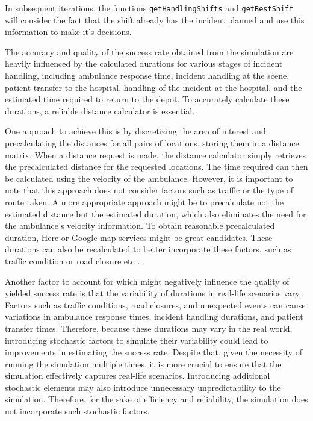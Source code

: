 In subsequent iterations, the functions \texttt{getHandlingShifts} and
\texttt{getBestShift} will consider the fact that the shift already has the
incident planned and use this information to make it's decisions.

The accuracy and quality of the success rate obtained from the simulation are
heavily influenced by the calculated durations for various stages of incident
handling, including ambulance response time, incident handling at the scene,
patient transfer to the hospital, handling of the incident at the hospital, and
the estimated time required to return to the depot. To accurately calculate
these durations, a reliable distance calculator is essential.

One approach to achieve this is by discretizing the area of interest and
precalculating the distances for all pairs of locations, storing them in a
distance matrix. When a distance request is made, the distance calculator
simply retrieves the precalculated distance for the requested locations. The
time required can then be calculated using the velocity of the ambulance.
However, it is important to note that this approach does not consider factors
such as traffic or the type of route taken. A more appropriate approach might
be to precalculate not the estimated distance but the estimated duration, which
also eliminates the need for the ambulance's velocity information. To obtain
reasonable precalculated duration, Here or Google map services might be great
candidates. These durations can also be recalculated to better incorporate
these factors, such as traffic condition or road closure etc ...

Another factor to account for which might negatively influence the quality of
yielded success rate is that the variability of durations in real-life
scenarios vary. Factors such as traffic conditions, road closures, and
unexpected events can cause variations in ambulance response times, incident
handling durations, and patient transfer times. Therefore, because these
durations may vary in the real world, introducing stochastic factors to
simulate their variability could lead to improvements in estimating the success
rate. Despite that, given the necessity of running the simulation multiple
times, it is more crucial to ensure that the simulation effectively captures
real-life scenarios. Introducing additional stochastic elements may also
introduce unnecessary unpredictability to the simulation. Therefore, for the
sake of efficiency and reliability, the simulation does not incorporate such
stochastic factors.

